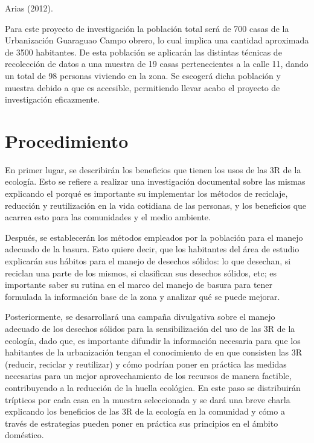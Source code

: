  Arias (2012).

Para este proyecto de investigación la población total será de 700 casas de la Urbanización Guaraguao Campo obrero, lo cual implica una cantidad aproximada de 3500 habitantes. De esta población se aplicarán las distintas técnicas de recolección de datos a una muestra de 19 casas pertenecientes a la calle 11, dando un total de 98 personas viviendo en la zona. Se escogerá dicha población y muestra debido a que es accesible, permitiendo llevar acabo el proyecto de investigación eficazmente.

\section{Procedimiento}

En primer lugar, se describirán los beneficios que tienen los usos de las 3R de la ecología. Esto se refiere a realizar una investigación documental sobre las mismas explicando el porqué es importante su implementar los métodos de reciclaje, reducción y reutilización en la vida cotidiana de las personas, y los beneficios que acarrea esto para las comunidades y el medio ambiente.

Después, se establecerán los métodos empleados por la población para el manejo adecuado de la basura. Esto quiere decir, que los habitantes del área de estudio explicarán sus hábitos para el manejo de desechos sólidos: lo que desechan, si reciclan una parte de los mismos, si clasifican sus desechos sólidos, etc; es importante saber su rutina en el marco del manejo de basura para tener formulada la información base de la zona y analizar qué se puede mejorar.

Posteriormente, se desarrollará una campaña divulgativa sobre el manejo adecuado de los desechos sólidos para la sensibilización del uso de las 3R de la ecología, dado que, es importante difundir la información necesaria para que los habitantes de la urbanización tengan el conocimiento de en que consisten las 3R (reducir, reciclar y reutilizar) y cómo podrían poner en práctica las medidas necesarias para un mejor aprovechamiento de los recursos de manera factible, contribuyendo a la reducción de la huella ecológica. En este paso se distribuirán trípticos por cada casa en la muestra seleccionada y se dará una breve charla explicando los beneficios de las 3R de la ecología en la comunidad y cómo a través de estrategias pueden poner en práctica sus principios en el ámbito doméstico.


